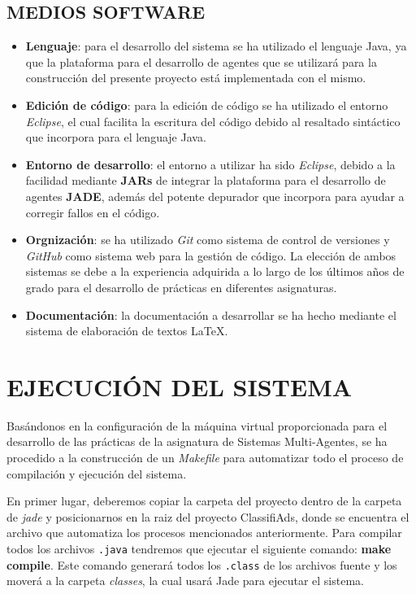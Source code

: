 \documentclass{pre-tfg}
\begin{document}
\subsection{MEDIOS SOFTWARE}

\begin{itemize}
 \item \textbf{Lenguaje}: para el desarrollo del sistema se ha utilizado el lenguaje Java, ya que la plataforma para el desarrollo 
 de agentes que se utilizará para la construcción del presente proyecto está implementada con el mismo.
 \item \textbf{Edición de código}: para la edición de código se ha utilizado el entorno \textit{Eclipse}, el cual facilita la escritura 
 del código debido al resaltado sintáctico que incorpora para el lenguaje Java.
 \item \textbf{Entorno de desarrollo}: el entorno a utilizar ha sido \textit{Eclipse}, debido a la facilidad mediante \textbf{JARs} de 
 integrar la plataforma para el desarrollo de agentes \textbf{JADE}, además del potente depurador que incorpora para ayudar a 
 corregir fallos en el código.
 \item \textbf{Orgnización}: se ha utilizado \textit{Git} como sistema de control de versiones y \textit{GitHub} como sistema web
 para la gestión de código. La elección de ambos sistemas se debe a la experiencia adquirida a lo largo de los últimos años de grado
 para el desarrollo de prácticas en diferentes asignaturas.
 \item \textbf{Documentación}: la documentación a desarrollar se ha hecho mediante el sistema de elaboración de textos \LaTeX.
\end{itemize}

\section{EJECUCIÓN DEL SISTEMA}

Basándonos en la configuración de la máquina virtual proporcionada para el desarrollo de las prácticas de la asignatura de Sistemas Multi-Agentes, 
se ha procedido a la construcción de un \textit{Makefile} para automatizar todo el proceso de compilación y ejecución
del sistema.

En primer lugar, deberemos copiar la carpeta del proyecto dentro de la carpeta de \textit{jade} y posicionarnos en la raiz del proyecto ClassifiAds, 
donde se encuentra el archivo que automatiza los procesos mencionados anteriormente. Para compilar todos los archivos \verb|.java| tendremos 
que ejecutar el siguiente comando: \textbf{make compile}. Este comando generará todos los \verb|.class| de los archivos fuente y los moverá a la
carpeta \textit{classes}, la cual usará Jade para ejecutar el sistema.
\end{document}
